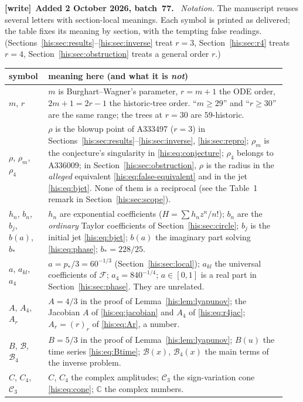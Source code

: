 \documentclass[11pt]{article}
\theoremstyle{remark}\newtheorem{remark}[theorem]{Remark}
\newcommand{\C}{\mathbb C}
\numberwithin{equation}{section}
\newenvironment{writenote}[1][]{\par\smallskip\begingroup\small
 \noindent\textbf{[write]}\if\relax\detokenize{#1}\relax\else~\textbf{#1.}\fi\ }%
 {\par\endgroup\smallskip}
\begin{document}
\begin{writenote}[Added 2 October 2026, batch~77]
\emph{Notation.} The manuscript reuses several letters with section-local
meanings. Each symbol is printed as delivered; the table fixes its meaning by
section, with the tempting false readings. (Sections~\ref{his:sec:results}--\ref{his:sec:inverse}
treat $r=3$, Section~\ref{his:sec:r4} treats $r=4$, Section~\ref{his:sec:obstruction}
treats a general order $r$.)
\begin{center}\footnotesize
\begin{tabular}{@{}p{0.13\linewidth}p{0.81\linewidth}@{}}
\toprule
symbol & meaning here (and what it is \emph{not})\\
\midrule
$m$, $r$ & $m$ is Burghart--Wagner's parameter, $r=m+1$ the ODE order, $2m+1=2r-1$ the historic-tree order. ``$m\ge29$'' and ``$r\ge30$'' are the same range; the trees at $r=30$ are $59$-historic.\\
$\rho$, $\rho_m$, $\rho_4$ & $\rho$ is the blowup point of A333497 ($r=3$) in Sections~\ref{his:sec:results}--\ref{his:sec:inverse}, \ref{his:sec:repro}; $\rho_m$ is the conjecture's singularity in \eqref{his:eq:conjecture}; $\rho_4$ belongs to A336009; in Section~\ref{his:sec:obstruction}, $\rho$ is the radius in the \emph{alleged} equivalent \eqref{his:eq:false-equivalent} and in the jet \eqref{his:eq:bjet}. None of them is a reciprocal (see the Table~1 remark in Section~\ref{his:sec:scope}).\\
$h_n$, $b_n$, $b_j$, $b(a)$, $b_*$ & $h_n$ are exponential coefficients ($H=\sum h_nz^n/n!$); $b_n$ are the \emph{ordinary} Taylor coefficients of Section~\ref{his:sec:circle}; $b_j$ is the initial jet \eqref{his:eq:bjet}; $b(a)$ the imaginary part solving \eqref{his:eq:phase}; $b_*=228/25$.\\
$a$, $a_{kl}$, $a_4$ & $a=p_*/3=60^{-1/3}$ (Section~\ref{his:sec:local}); $a_{kl}$ the universal coefficients of $\mathcal F$; $a_4=840^{-1/4}$; $a\in[0,1]$ is a real part in Section~\ref{his:sec:phase}. They are unrelated.\\
$A$, $A_4$, $A_r$ & $A=4/3$ in the proof of Lemma~\ref{his:lem:lyapunov}; the Jacobian $A$ of \eqref{his:eq:jacobian} and $A_4$ of \eqref{his:eq:r4jac}; $A_r=(r)_r$ of \eqref{his:eq:Ar}, a number.\\
$B$, $\mathcal B$, $\mathcal B_4$ & $B=5/3$ in the proof of Lemma~\ref{his:lem:lyapunov}; $B(u)$ the time series \eqref{his:eq:Btime}; $\mathcal B(x)$, $\mathcal B_4(x)$ the main terms of the inverse problem.\\
$C$, $C_4$, $\mathcal C_3$ & $C$, $C_4$ the complex amplitudes; $\mathcal C_3$ the sign-variation cone \eqref{his:eq:cone}; $\C$ the complex numbers.\\

\end{tabular}
\end{center}
\end{writenote}
\end{document}
